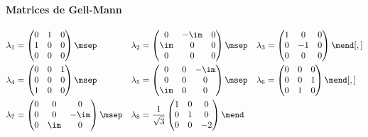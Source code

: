 \paragraph{Matrices de Gell-Mann}

\begin{align}
\lambda_1 &= \begin{pmatrix}0&1&0\\1&0&0\\0&0&0\end{pmatrix}
\msep&
\lambda_2 &= \begin{pmatrix}0&-\im&0\\\im&0&0\\0&0&0\end{pmatrix}
\msep&
\lambda_3 &= \begin{pmatrix}1&0&0\\0&-1&0\\0&0&0\end{pmatrix}
\mend[,]
\nonumber\\
\lambda_4 &= \begin{pmatrix}0&0&1\\0&0&0\\1&0&0\end{pmatrix}
\msep&
\lambda_5 &= \begin{pmatrix}0&0&-\im\\0&0&0\\\im&0&0\end{pmatrix}
\msep&
\lambda_6 &= \begin{pmatrix}0&0&0\\0&0&1\\0&1&0\end{pmatrix}
\mend[,]
\nonumber\\
\lambda_7 &= \begin{pmatrix}0&0&0\\0&0&-\im\\0&\im&0\end{pmatrix}
\msep&
\lambda_8 &= \frac{1}{\sqrt{3}}\begin{pmatrix}1&0&0\\0&1&0\\0&0&-2\end{pmatrix}
\mend
\end{align}